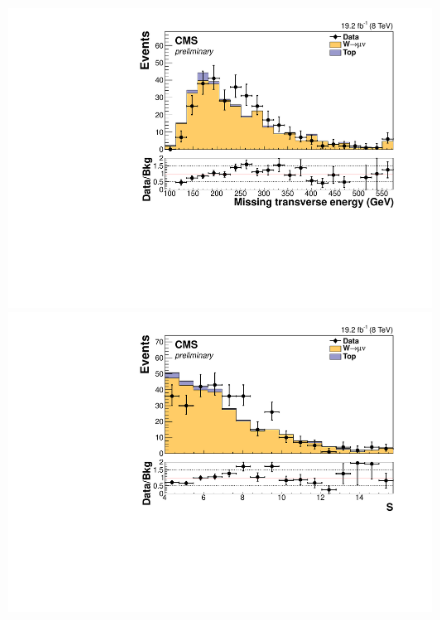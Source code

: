 \begin{figure}
  \includegraphics[width=.65\largefigwidth]{plots/parked/HIG-14-038-figs/output_sigreg/munu_metnomuons.pdf}
  \includegraphics[width=.65\largefigwidth]{plots/parked/HIG-14-038-figs/output_sigreg/munu_metnomu_significance.pdf}


\end{figure}

